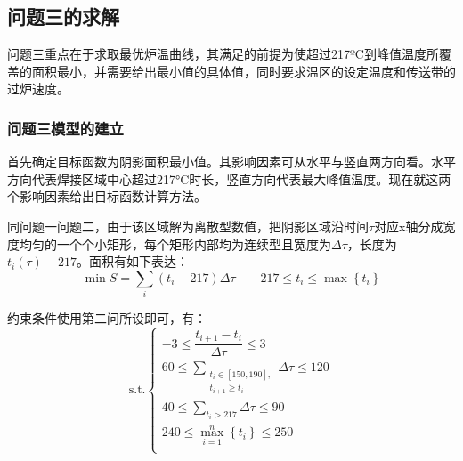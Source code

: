 \documentclass[a4paper,12pt]{ctexart} %
\begin{document}
	\subsection{问题三的求解}
	问题三重点在于求取最优炉温曲线，其满足的前提为使超过217ºC到峰值温度所覆盖的面积最小，并需要给出最小值的具体值，同时要求温区的设定温度和传送带的过炉速度。\par
	\subsubsection{问题三模型的建立}
	首先确定目标函数为阴影面积最小值。其影响因素可从水平与竖直两方向看。水平方向代表焊接区域中心超过217°C时长，竖直方向代表最大峰值温度。现在就这两个影响因素给出目标函数计算方法。\par
	同问题一问题二，由于该区域解为离散型数值，把阴影区域沿时间$\tau$对应x轴分成宽度均匀的一个个小矩形，每个矩形内部均为连续型且宽度为$\varDelta\tau$，长度为$t_i\left(\tau\right)-217$。面积有如下表达：
	\begin{equation}
	\label{e7}
	\min S=\sum_{i}(t_i-217)\varDelta\tau\quad\quad 217\leqslant t_i\leqslant\max\left\{{t_i}\right\}
	\end{equation}\par
	约束条件使用第二问所设即可，有：
	\begin{equation}
	\label{e6}
	\text{s.t.}\begin{cases}
	-3\leqslant\dfrac{t_{i+1}-t_i}{\varDelta\tau}\leqslant 3\\[1em]
	60\leqslant\sum\limits_{\begin{smallmatrix}
		t_i\in[150,190],\\
		t_{i+1}\geqslant t_i
		\end{smallmatrix}} \varDelta\tau\leqslant 120\\[1em]
	40\leqslant\sum\limits_{t_i>217}\varDelta\tau\leqslant 90\\[1em]
	240\leqslant\max\limits_{i=1}^{n}\left\{t_i\right\}\leqslant 250\\
	\end{cases}
	\end{equation}\par
\end{document}
